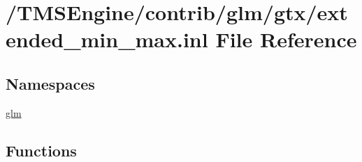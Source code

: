 \hypertarget{extended__min__max_8inl}{}\section{/\+T\+M\+S\+Engine/contrib/glm/gtx/extended\+\_\+min\+\_\+max.inl File Reference}
\label{extended__min__max_8inl}
\subsection*{Namespaces}
\begin{DoxyCompactItemize}
\item 
 \hyperlink{namespaceglm}{glm}
\end{DoxyCompactItemize}
\subsection*{Functions}
